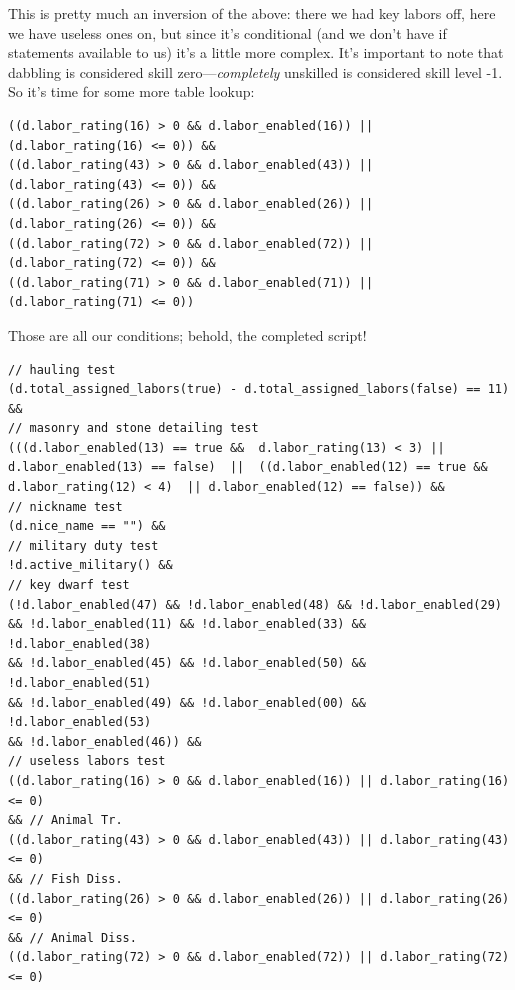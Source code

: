 \documentclass[]{article}
\begin{document}
This is pretty much an inversion of the above: there we had key labors off, here we have useless ones on,
but since it's conditional (and we don't have if statements available to us) it's a little more complex.
It's important to note that dabbling is considered skill zero---\emph{completely} unskilled is considered
skill level -1. So it's time for some more table lookup:
\begin{verbatim}
((d.labor_rating(16) > 0 && d.labor_enabled(16)) || (d.labor_rating(16) <= 0)) &&
((d.labor_rating(43) > 0 && d.labor_enabled(43)) || (d.labor_rating(43) <= 0)) &&
((d.labor_rating(26) > 0 && d.labor_enabled(26)) || (d.labor_rating(26) <= 0)) &&
((d.labor_rating(72) > 0 && d.labor_enabled(72)) || (d.labor_rating(72) <= 0)) &&
((d.labor_rating(71) > 0 && d.labor_enabled(71)) || (d.labor_rating(71) <= 0))
\end{verbatim}

Those are all our conditions; behold, the completed script!
\begin{verbatim}
// hauling test
(d.total_assigned_labors(true) - d.total_assigned_labors(false) == 11) && 
// masonry and stone detailing test
(((d.labor_enabled(13) == true &&  d.labor_rating(13) < 3) ||
d.labor_enabled(13) == false)  ||  ((d.labor_enabled(12) == true && 
d.labor_rating(12) < 4)  || d.labor_enabled(12) == false)) &&
// nickname test
(d.nice_name == "") &&
// military duty test
!d.active_military() &&
// key dwarf test
(!d.labor_enabled(47) && !d.labor_enabled(48) && !d.labor_enabled(29)
&& !d.labor_enabled(11) && !d.labor_enabled(33) && !d.labor_enabled(38)
&& !d.labor_enabled(45) && !d.labor_enabled(50) && !d.labor_enabled(51)
&& !d.labor_enabled(49) && !d.labor_enabled(00) && !d.labor_enabled(53)
&& !d.labor_enabled(46)) &&
// useless labors test
((d.labor_rating(16) > 0 && d.labor_enabled(16)) || d.labor_rating(16) <= 0)
&& // Animal Tr.
((d.labor_rating(43) > 0 && d.labor_enabled(43)) || d.labor_rating(43) <= 0)
&& // Fish Diss.
((d.labor_rating(26) > 0 && d.labor_enabled(26)) || d.labor_rating(26) <= 0)
&& // Animal Diss.
((d.labor_rating(72) > 0 && d.labor_enabled(72)) || d.labor_rating(72) <= 0)
\end{verbatim}
\end{document}
